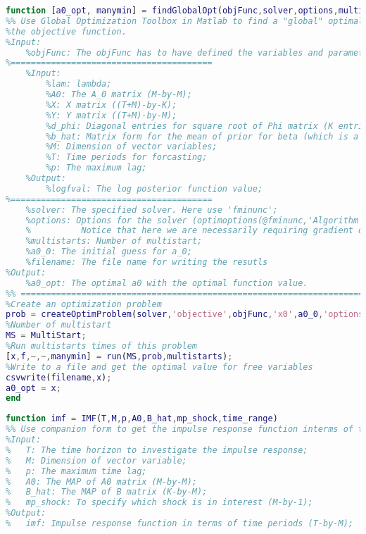 \documentclass[11pt, oneside]{article}   	%
\begin{document}
\begin{appendices}
\begin{lstlisting}[language=Matlab ,caption={\textit{findGlobalOpt.m} uses multi-starts in global optimization toolbox to find somewhat ``global" optimal value for matrix $A_0$ by maximizing the marginal posterior \ref{eqn:post_A0}}, label={code:findGlobalOpt}]
function [a0_opt, manymin] = findGlobalOpt(objFunc,solver,options,multistarts,a0_0,filename)
%% Use Global Optimization Toolbox in Matlab to find a "global" optimal of
%the objective function.
%Input: 
    %objFunc: The objFunc has to have defined the variables and parameters
%========================================
    %Input:
        %lam: lambda;
        %A0: The A_0 matrix (M-by-M);
        %X: X matrix ((T+M)-by-K);
        %Y: Y matrix ((T+M)-by-M);
        %d_phi: Diagonal entries for square root of Phi matrix (K entries)
        %b_hat: Matrix form for the mean of prior for beta (which is a vector form of B);
        %M: Dimension of vector variables;
        %T: Time periods for forcasting;
        %p: The maximum lag;
    %Output:
        %logfval: The log posterior function value;
%========================================
    %solver: The specified solver. Here use 'fminunc';
    %options: Options for the solver (optimoptions(@fminunc,'Algorithm','quasi-newton','Display', 'off')).
    %          Notice that here we are necessarily requiring gradient of objFunc
    %multistarts: Number of multistart;
    %a0_0: The initial guess for a_0;
    %filename: The file name for writing the resutls
%Output:
    %a0_opt: The optimal a0 with the optimal function value.
%% ==========================================================================
%Create an optimization problem
prob = createOptimProblem(solver,'objective',objFunc,'x0',a0_0,'options',options);
%Number of multistart
MS = MultiStart;
%Run multistarts times of this problem
[x,f,~,~,manymin] = run(MS,prob,multistarts);
%Write to a file and get the optimal value for free variables
csvwrite(filename,x);
a0_opt = x;
end
\end{lstlisting}

\begin{lstlisting}[language=Matlab ,caption={\textit{IMF.m} constructs impulse response functions using companion form.}, label={code:IMF}]
function imf = IMF(T,M,p,A0,B_hat,mp_shock,time_range)
%% Use companion form to get the impulse response function interms of time.
%Input:
%   T: The time horizon to investigate the impulse response;
%   M: Dimension of vector variable;
%   p: The maximum time lag;
%   A0: The MAP of A0 matrix (M-by-M);
%   B_hat: The MAP of B matrix (K-by-M);
%   mp_shock: To specify which shock is in interest (M-by-1);
%Output:
%   imf: Impulse response function in terms of time periods (T-by-M);


\end{lstlisting}
\end{appendices}
\end{document}
